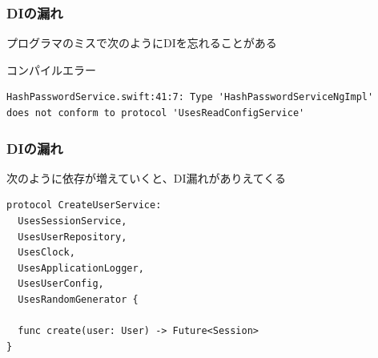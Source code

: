 \begin{frame}[fragile]
  \frametitle{DIの漏れ}

  \pause

  プログラマのミスで次のようにDIを忘れることがある
  

  \pause

  \begin{alertblock}{コンパイルエラー}
\begin{lstlisting}[basicstyle=\listingfont\scriptsize]
HashPasswordService.swift:41:7: Type 'HashPasswordServiceNgImpl'
does not conform to protocol 'UsesReadConfigService'
\end{lstlisting}
  \end{alertblock}

  \pause

  \begin{center}

    \pause

  \end{center}
\end{frame}

\begin{frame}[fragile]
  \frametitle{DIの漏れ}

  次のように依存が増えていくと、DI漏れがありえてくる
\begin{lstlisting}[style=swift]
protocol CreateUserService: 
  UsesSessionService,
  UsesUserRepository,
  UsesClock,
  UsesApplicationLogger,
  UsesUserConfig,
  UsesRandomGenerator {

  func create(user: User) -> Future<Session>
}
\end{lstlisting}

  \pause

  \begin{center}

    \pause
    
  \end{center}
\end{frame}


